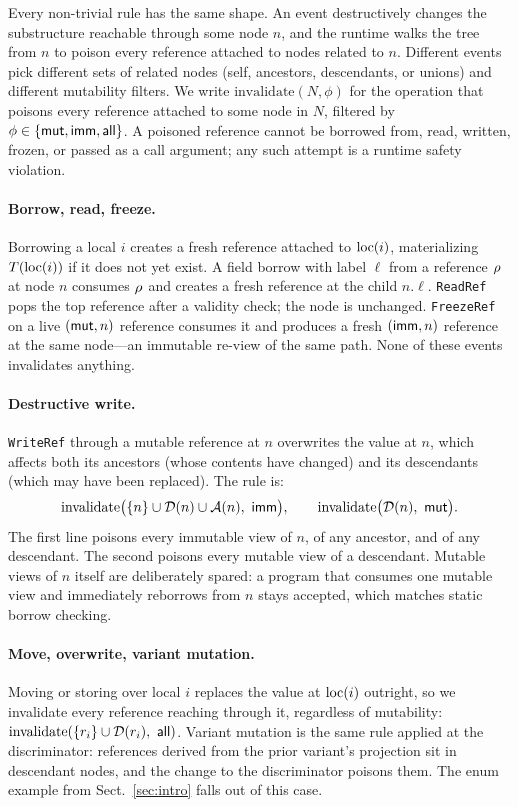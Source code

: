 Every non-trivial rule has the same shape. An event destructively
changes the substructure reachable through some node $n$, and the
runtime walks the tree from $n$ to poison every reference attached to
nodes related to $n$. Different events pick different sets of
related nodes (self, ancestors, descendants, or unions) and different
mutability filters. We write $\mathrm{invalidate}(N, \phi)$ for the
operation that poisons every reference attached to some node in
$N$, filtered by $\phi \in \{\mathsf{mut}, \mathsf{imm}, \mathsf{all}\}$. A poisoned
reference cannot be borrowed from, read, written, frozen, or passed
as a call argument; any such attempt is a runtime safety violation.

\paragraph{Borrow, read, freeze.}
Borrowing a local $i$ creates a fresh reference attached to
$\mathrm{loc}(i)$, materializing $T(\mathrm{loc}(i))$ if it does not yet exist. A
field borrow with label $\ell$ from a reference $\rho_{}$ at node $n$
consumes $\rho_{}$ and creates a fresh reference at the child
$n.\ell$. \texttt{ReadRef} pops the top reference after a validity
check; the node is unchanged. \texttt{FreezeRef} on a live $(\mathsf{mut}, n)$
reference consumes it and produces a fresh $(\mathsf{imm}, n)$ reference at
the same node---an immutable re-view of the same path. None of these
events invalidates anything.

\paragraph{Destructive write.}
\texttt{WriteRef} through a mutable reference at $n$ overwrites the
value at $n$, which affects both its ancestors (whose contents have
changed) and its descendants (which may have been replaced). The rule
is:
\[
\mathrm{invalidate}\bigl(\{n\} \cup \mathcal{D}(n) \cup \mathcal{A}(n),\ \mathsf{imm}\bigr),\qquad
\mathrm{invalidate}\bigl(\mathcal{D}(n),\ \mathsf{mut}\bigr).
\]
The first line poisons every immutable view of $n$, of any ancestor,
and of any descendant. The second poisons every mutable view of a
descendant. Mutable views of $n$ itself are deliberately spared: a
program that consumes one mutable view and immediately reborrows from
$n$ stays accepted, which matches static borrow checking.

\paragraph{Move, overwrite, variant mutation.}
Moving or storing over local $i$ replaces the value at $\mathrm{loc}(i)$
outright, so we invalidate every reference reaching through it,
regardless of mutability:
$\mathrm{invalidate}(\{r_i\} \cup \Desc(r_i),\ \mathsf{all})$.
Variant mutation is the same rule applied at the discriminator:
references derived from the prior variant's projection sit in
descendant nodes, and the change to the discriminator poisons them.
The enum example from Sect.~\ref{sec:intro} falls out of this case.

